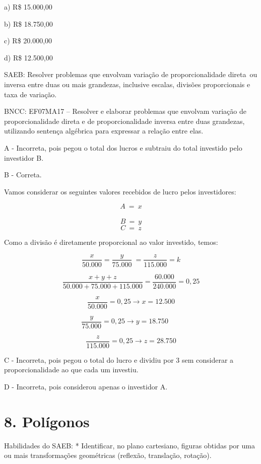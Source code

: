a) R\$ 15.000,00

b) R\$ 18.750,00

c) R\$ 20.000,00

d) R\$ 12.500,00

SAEB: Resolver problemas que envolvam variação de proporcionalidade
direta~ou inversa entre duas ou mais grandezas, inclusive escalas,
divisões proporcionais e taxa de variação.

BNCC: EF07MA17 -- Resolver e elaborar problemas que envolvam variação de
proporcionalidade direta e de proporcionalidade inversa entre duas
grandezas, utilizando sentença algébrica para expressar a relação entre
elas.

A - Incorreta, pois pegou o total dos lucros e subtraiu do total
investido pelo investidor B.

B - Correta.

Vamos considerar os seguintes valores recebidos de lucro pelos
investidores:

\[A\  = \ x\]\\
\[B\  = \ y\] \[C\  = \ z\]

Como a divisão é diretamente proporcional ao valor investido, temos:

\[\frac{x}{50.000} = \frac{y}{75.000}\  = \frac{z}{115.000} = k\]

\[\frac{x + y + z}{50.000 + 75.000 + 115.000} = \frac{60.000}{240.000} = 0,25\]

\[\frac{x}{50.000} = 0,25 \rightarrow x = 12.500\]

\[\ \frac{y}{75.000} = 0,25 \rightarrow y = 18.750\ \ \ \ \ \ \ \ \ \]

\[\frac{z}{115.000} = 0,25 \rightarrow z = 28.750\]

C - Incorreta, pois pegou o total do lucro e dividiu por 3 sem
considerar a proporcionalidade ao que cada um investiu.

D - Incorreta, pois considerou apenas o investidor A.

\hypertarget{poluxedgonos}{%
\section{8. Polígonos}\label{poluxedgonos}}

Habilidades do SAEB: * Identificar, no plano cartesiano, figuras obtidas
por uma ou mais transformações geométricas (reflexão, translação,
rotação).

